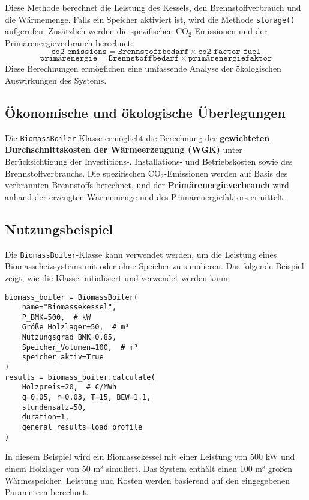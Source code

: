 \begin{itemize}
    Diese Methode berechnet die Leistung des Kessels, den Brennstoffverbrauch und die Wärmemenge. Falls ein Speicher aktiviert ist, wird die Methode \texttt{storage()} aufgerufen. Zusätzlich werden die spezifischen CO$_2$-Emissionen und der Primärenergieverbrauch berechnet:
    \[
    \texttt{co2\_emissions} = \texttt{Brennstoffbedarf} \times \texttt{co2\_factor\_fuel}
    \]
    \[
    \texttt{primärenergie} = \texttt{Brennstoffbedarf} \times \texttt{primärenergiefaktor}
    \]
    Diese Berechnungen ermöglichen eine umfassende Analyse der ökologischen Auswirkungen des Systems.
\end{itemize}

\subsection{Ökonomische und ökologische Überlegungen}
Die \texttt{BiomassBoiler}-Klasse ermöglicht die Berechnung der \textbf{gewichteten Durchschnittskosten der Wärmeerzeugung (WGK)} unter Berücksichtigung der Investitions-, Installations- und Betriebskosten sowie des Brennstoffverbrauchs. Die spezifischen CO$_2$-Emissionen werden auf Basis des verbrannten Brennstoffs berechnet, und der \textbf{Primärenergieverbrauch} wird anhand der erzeugten Wärmemenge und des Primärenergiefaktors ermittelt.

\subsection{Nutzungsbeispiel}
Die \texttt{BiomassBoiler}-Klasse kann verwendet werden, um die Leistung eines Biomasseheizsystems mit oder ohne Speicher zu simulieren. Das folgende Beispiel zeigt, wie die Klasse initialisiert und verwendet werden kann:

\begin{verbatim}
biomass_boiler = BiomassBoiler(
    name="Biomassekessel",
    P_BMK=500,  # kW
    Größe_Holzlager=50,  # m³
    Nutzungsgrad_BMK=0.85,
    Speicher_Volumen=100,  # m³
    speicher_aktiv=True
)
results = biomass_boiler.calculate(
    Holzpreis=20,  # €/MWh
    q=0.05, r=0.03, T=15, BEW=1.1, 
    stundensatz=50, 
    duration=1, 
    general_results=load_profile
)
\end{verbatim}
In diesem Beispiel wird ein Biomassekessel mit einer Leistung von 500 kW und einem Holzlager von 50 m³ simuliert. Das System enthält einen 100 m³ großen Wärmespeicher. Leistung und Kosten werden basierend auf den eingegebenen Parametern berechnet.